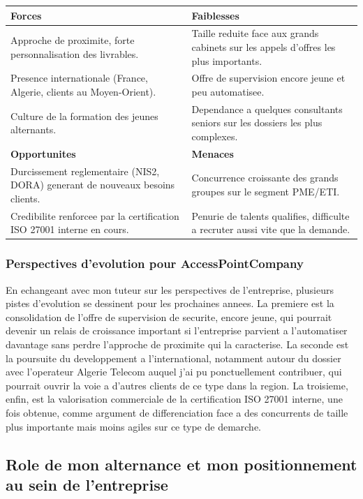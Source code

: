 \documentclass[11pt,a4paper]{article}
\begin{document}
\begin{center}
\small
\begin{tabular}{@{}p{7.2cm}p{7.2cm}@{}}
\toprule
\textbf{Forces} & \textbf{Faiblesses} \\
\midrule
Approche de proximite, forte personnalisation des livrables. &
Taille reduite face aux grands cabinets sur les appels d'offres les plus importants. \\
Presence internationale (France, Algerie, clients au Moyen-Orient). &
Offre de supervision encore jeune et peu automatisee. \\
Culture de la formation des jeunes alternants. &
Dependance a quelques consultants seniors sur les dossiers les plus complexes. \\
\midrule
\textbf{Opportunites} & \textbf{Menaces} \\
\midrule
Durcissement reglementaire (NIS2, DORA) generant de nouveaux besoins clients. &
Concurrence croissante des grands groupes sur le segment PME/ETI. \\
Credibilite renforcee par la certification ISO 27001 interne en cours. &
Penurie de talents qualifies, difficulte a recruter aussi vite que la demande. \\
\bottomrule
\end{tabular}
\end{center}

\subsubsection*{Perspectives d'evolution pour AccessPointCompany}

En echangeant avec mon tuteur sur les perspectives de l'entreprise, plusieurs pistes d'evolution se dessinent pour les prochaines annees. La premiere est la consolidation de l'offre de supervision de securite, encore jeune, qui pourrait devenir un relais de croissance important si l'entreprise parvient a l'automatiser davantage sans perdre l'approche de proximite qui la caracterise. La seconde est la poursuite du developpement a l'international, notamment autour du dossier avec l'operateur Algerie Telecom auquel j'ai pu ponctuellement contribuer, qui pourrait ouvrir la voie a d'autres clients de ce type dans la region. La troisieme, enfin, est la valorisation commerciale de la certification ISO 27001 interne, une fois obtenue, comme argument de differenciation face a des concurrents de taille plus importante mais moins agiles sur ce type de demarche.

\subsection{Role de mon alternance et mon positionnement au sein de l'entreprise}
\end{document}
